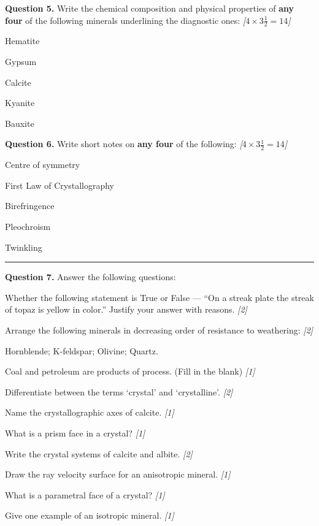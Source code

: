 \documentclass[11pt,a4paper]{article}
\newcommand{\pts}[1]{\hfill   \textit{[#1]}}
\begin{document}
\medskip


\noindent   \textbf{Question 5.} Write the chemical composition and physical properties of   \textbf{any four} of the following minerals underlining the diagnostic ones: \pts{$4  \times 3\frac{1}{2} = 14$}

\begin{parts}
  \item Hematite
  \item Gypsum
  \item Calcite
  \item Kyanite
  \item Bauxite
\end{parts}

\medskip


\noindent   \textbf{Question 6.} Write short notes on   \textbf{any four} of the following: \pts{$4  \times 3\frac{1}{2} = 14$}

\begin{parts}
  \item Centre of symmetry
  \item First Law of Crystallography
  \item Birefringence
  \item Pleochroism
  \item Twinkling
\end{parts}

\bigskip


\rule{\linewidth}{0.4pt}\smallskip




\noindent   \textbf{Question 7.} Answer the following questions:

\begin{parts}
  \item Whether the following statement is True or False --- ``On a streak plate the streak of topaz is yellow in color.'' Justify your answer with reasons. \pts{2}
  \item Arrange the following minerals in decreasing order of resistance to weathering: \pts{2}
  
\begin{center}
    Hornblende; K-feldspar; Olivine; Quartz.
  \end{center}
  \item Coal and petroleum are products of \underline{\hspace{4cm}} process. (Fill in the blank) \pts{1}
  \item Differentiate between the terms `crystal' and `crystalline'. \pts{2}
  \item Name the crystallographic axes of calcite. \pts{1}
  \item What is a prism face in a crystal? \pts{1}
  \item Write the crystal systems of calcite and albite. \pts{2}
  \item Draw the ray velocity surface for an anisotropic mineral. \pts{1}
  \item What is a parametral face of a crystal? \pts{1}
  \item Give one example of an isotropic mineral. \pts{1}
\end{parts}
\end{document}
